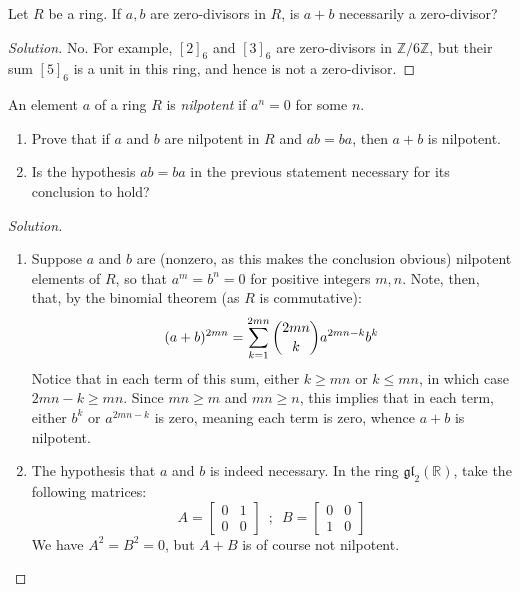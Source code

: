 \documentclass[12pt]{article}
\newenvironment{problem}[2][Problem]{\begin{trivlist}
\item[\hskip \labelsep {\bfseries #1}\hskip \labelsep {\bfseries #2.}]}{\end{trivlist}}
\newenvironment{solution}
  {\renewcommand\qedsymbol{$\blacksquare$}\begin{proof}[Solution]}
{\end{proof}}
\theoremstyle{remark}
\begin{document}
\begin{problem}{1.5}
  Let $R$ be a ring.
  If $a,b$ are zero-divisors in $R$, is $a+b$ necessarily a zero-divisor?
\end{problem}
\begin{solution}
  No. For example, $[2]_6$ and $[3]_6$ are zero-divisors in $\mathbb{Z}/6\mathbb{Z}$, but 
  their sum $[5]_6$ is a unit in this ring, and hence is not a zero-divisor.
\end{solution}

\begin{problem}{1.6}
  An element $a$ of a ring $R$ is \textit{nilpotent} if $a^n=0$ for some $n$.
  \begin{enumerate}
    \item Prove that if $a$ and $b$ are nilpotent in $R$ and $ab=ba$, then $a+b$ is nilpotent.
    \item Is the hypothesis $ab=ba$ in the previous statement necessary for its conclusion
    to hold?
  \end{enumerate}
\end{problem}
\begin{solution}\ 
  \begin{enumerate}
    \item Suppose $a$ and $b$ are (nonzero, as this makes the conclusion obvious) 
      nilpotent elements of $R$, so that $a^m=b^n=0$ for positive integers $m,n$.
      Note, then, that, by the binomial theorem (as $R$ is commutative):
      \begin{equation*}
        (a+b)^{2mn} = \sum_{k=1}^{2mn} \binom{2mn}{k} a^{2mn-k}b^k \\
      \end{equation*}
      Notice that in each term of this sum, either $k\geq mn$ or $k\leq mn$, in which case
      $2mn-k\geq mn$.
      Since $mn\geq m$ and $mn\geq n$, this implies that in each term, either
      $b^k$ or $a^{2mn-k}$ is zero, meaning each term is zero, whence $a+b$ is nilpotent.  

    \item The hypothesis that $a$ and $b$ is indeed necessary.
        In the ring $\mathfrak{gl}_2(\mathbb{R})$, take the following matrices:
        \begin{equation*}
            A=\begin{bmatrix} 0 & 1 \\ 0 & 0 \end{bmatrix}\enspace;\enspace
            B=\begin{bmatrix} 0 & 0 \\ 1 & 0 \end{bmatrix}
        \end{equation*}
        We have $A^2=B^2=0$, but $A+B$ is of course not nilpotent.
  \end{enumerate}
\end{solution}
\end{document}

